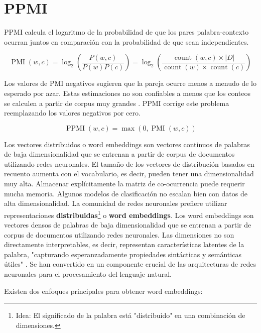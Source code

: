\section{PPMI}
PPMI calcula el logaritmo de la probabilidad de que los pares palabra-contexto ocurran juntos en comparación con la probabilidad de que sean independientes.

\begin{equation}
 \operatorname{PMI}(w, c)= \log_2 \left( \frac{P(w,c)}{P(w)P(c)} \right) = \log_{2} \left ( \frac{\operatorname{count}(w,c)\times |D|}{\operatorname{count}(w)\times \operatorname{count}(c)} \right ) 
\end{equation}


Los valores de PMI negativos sugieren que la pareja ocurre menos a menudo de lo esperado por azar.
Estas estimaciones no son confiables a menos que los conteos se calculen a partir de corpus muy grandes \cite{JurafskyBook}.
PPMI corrige este problema reemplazando los valores negativos por cero.

\begin{equation}
 \operatorname{PPMI}(w, c)= \operatorname{max}(0,\operatorname{PMI}(w, c))
\end{equation}



Los vectores distribuidos o word embeddings son vectores continuos de palabras de baja dimensionalidad que se entrenan a partir de corpus de documentos utilizando redes neuronales.
El tamaño de los vectores de distribución basados en recuento aumenta con el vocabulario, es decir, pueden tener una dimensionalidad muy alta.
Almacenar explícitamente la matriz de co-ocurrencia puede requerir mucha memoria.
Algunos modelos de clasificación no escalan bien con datos de alta dimensionalidad.
La comunidad de redes neuronales prefiere utilizar representaciones \textbf{distribuidas}\footnote{Idea: El significado de la palabra está "distribuido" en una combinación de dimensiones.} o \textbf{word embeddings}.
Los word embeddings son vectores densos de palabras de baja dimensionalidad que se entrenan a partir de corpus de documentos utilizando redes neuronales.
Las dimensiones no son directamente interpretables, es decir, representan características latentes de la palabra, "capturando esperanzadamente propiedades sintácticas y semánticas útiles" \cite{turian2010word}.
Se han convertido en un componente crucial de las arquitecturas de redes neuronales para el procesamiento del lenguaje natural.


Existen dos enfoques principales para obtener word embeddings:

